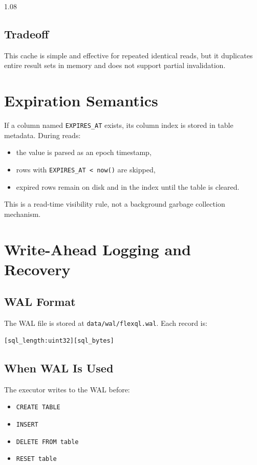 \documentclass[11pt,a4paper]{article}
\begin{document}
\begin{spacing}{1.08}
\subsection{Tradeoff}

This cache is simple and effective for repeated identical reads, but it duplicates entire result sets in memory and does not support partial invalidation.

\section{Expiration Semantics}

If a column named \texttt{EXPIRES\_AT} exists, its column index is stored in table metadata. During reads:

\begin{itemize}
    \item the value is parsed as an epoch timestamp,
    \item rows with \texttt{EXPIRES\_AT < now()} are skipped,
    \item expired rows remain on disk and in the index until the table is cleared.
\end{itemize}

This is a read-time visibility rule, not a background garbage collection mechanism.

\section{Write-Ahead Logging and Recovery}

\subsection{WAL Format}

The WAL file is stored at \texttt{data/wal/flexql.wal}. Each record is:

\begin{lstlisting}
[sql_length:uint32][sql_bytes]
\end{lstlisting}

\subsection{When WAL Is Used}

The executor writes to the WAL before:

\begin{itemize}
    \item \texttt{CREATE TABLE}
    \item \texttt{INSERT}
    \item \texttt{DELETE FROM table}
    \item \texttt{RESET table}
\end{itemize}


\end{spacing}
\end{document}

